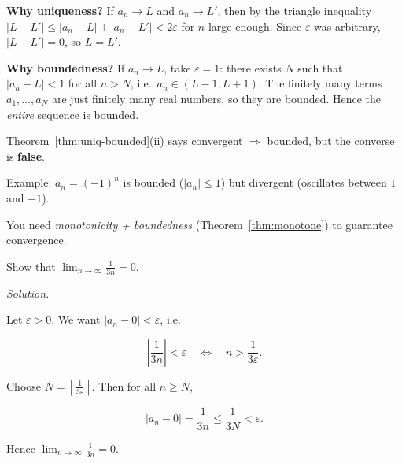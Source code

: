 \noindent
\textbf{Why uniqueness?}
If $a_n\to L$ and $a_n\to L'$, then by the triangle inequality $|L-L'|\le |a_n-L|+|a_n-L'|<2\varepsilon$ for $n$ large enough.
Since $\varepsilon$ was arbitrary, $|L-L'|=0$, so $L=L'$.

\noindent
\textbf{Why boundedness?}
If $a_n\to L$, take $\varepsilon=1$: there exists $N$ such that $|a_n-L|<1$ for all $n>N$, i.e.\ $a_n\in(L-1,L+1)$.
The finitely many terms $a_1,\dots,a_N$ are just finitely many real numbers, so they are bounded.
Hence the \emph{entire} sequence is bounded.

\begin{commonmistake}[title={Common Mistake: Converse of boundedness}]

Theorem~\ref{thm:uniq-bounded}(ii) says convergent $\Rightarrow$ bounded, but the converse is \textbf{false}.

Example: $a_n=(-1)^n$ is bounded ($|a_n|\le 1$) but divergent (oscillates between $1$ and $-1$).

You need \emph{monotonicity + boundedness} (Theorem~\ref{thm:monotone}) to guarantee convergence.

\end{commonmistake}

\begin{examplebox}[title={Worked Example (Tutorial 7, Question 1(a)): $\varepsilon$--$N$ proof for $a_n=\frac{1}{3n}$}]

Show that $\displaystyle \lim_{n\to\infty}\frac{1}{3n}=0$.

\emph{Solution.}

Let $\varepsilon>0$. We want $|a_n-0|<\varepsilon$, i.e.

\[
\left|\frac{1}{3n}\right|<\varepsilon
\quad\Longleftrightarrow\quad
n>\frac{1}{3\varepsilon}.
\]

Choose $N=\left\lceil \frac{1}{3\varepsilon}\right\rceil$. Then for all $n\ge N$,

\[
|a_n-0|=\frac{1}{3n}\le \frac{1}{3N}<\varepsilon.
\]

Hence $\displaystyle \boxed{\lim_{n\to\infty}\frac{1}{3n}=0}$.

\end{examplebox}

